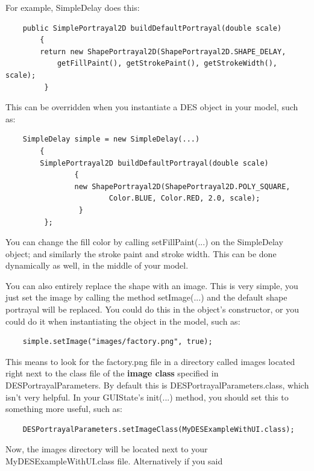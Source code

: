 \documentclass[twoside,10pt]{article}
\newcommand\file[1]{\textsf{#1}}
\newcommand\method[1]{\hbox{\textsf{#1}}}
\begin{document}
\vspace{11em}

For example, SimpleDelay does this:

\begin{verbatim}
    public SimplePortrayal2D buildDefaultPortrayal(double scale)
        {
        return new ShapePortrayal2D(ShapePortrayal2D.SHAPE_DELAY, 
            getFillPaint(), getStrokePaint(), getStrokeWidth(), scale);
         }
\end{verbatim}

This can be overridden when you instantiate a DES object in your model, such as:

\begin{verbatim}
    SimpleDelay simple = new SimpleDelay(...)
        {
        SimplePortrayal2D buildDefaultPortrayal(double scale)
                {
                new ShapePortrayal2D(ShapePortrayal2D.POLY_SQUARE,
                        Color.BLUE, Color.RED, 2.0, scale);
                 }
         };
\end{verbatim}

You can change the fill color by calling \method{setFillPaint(...)} on the SimpleDelay object; and similarly the stroke paint and stroke width.  This can be done dynamically as well, in the middle of your model.

You can also entirely replace the shape with an image.  This is very simple, you just set the image by calling the method \method{setImage(...)} and the default shape portrayal will be replaced.  You could do this in the object's constructor, or you could do it when instantiating the object in the model, such as:

\begin{verbatim}
    simple.setImage("images/factory.png", true);
\end{verbatim}

This means to look for the \file{factory.png} file in a directory called \file{images} located right next to the class file of the {\bf image class} specified in DESPortrayalParameters.  By default this is DESPortrayalParameters.class, which isn't very helpful.  In your GUIState's \method{init(...)} method, you should set this to something more useful, such as:

\begin{verbatim}
    DESPortrayalParameters.setImageClass(MyDESExampleWithUI.class);
\end{verbatim}

Now, the \file{images} directory will be located next to your MyDESExampleWithUI.class file.  Alternatively if you said 
\end{document}
